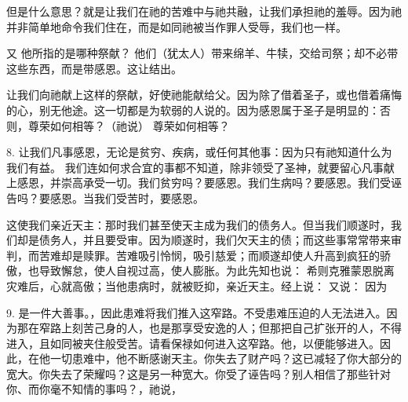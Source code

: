 但是什么意思？就是让我们在祂的苦难中与祂共融，让我们承担祂的羞辱。因为祂并非简单地命令我们住在，而是如同祂被当作罪人受辱，我们也一样。\par

又 他所指的是哪种祭献？ 他们（犹太人）带来绵羊、牛犊，交给司祭；却不必带这些东西，而是带感恩。这让结出。\par

 让我们向祂献上这样的祭献，好使祂能献给父。因为除了借着圣子，或也借着痛悔的心，别无他途。这一切都是为软弱的人说的。因为感恩属于圣子是明显的：否则，尊荣如何相等？（祂说）  尊荣如何相等？\par

8. 让我们凡事感恩，无论是贫穷、疾病，或任何其他事：因为只有祂知道什么为我们有益。  我们连如何求合宜的事都不知道，除非领受了圣神，就要留心凡事献上感恩，并崇高承受一切。我们贫穷吗？要感恩。我们生病吗？要感恩。我们受诬告吗？要感恩。当我们受苦时，要感恩。\par

这使我们亲近天主：那时我们甚至使天主成为我们的债务人。但当我们顺遂时，我们却是债务人，并且要受审。因为顺遂时，我们欠天主的债；而这些事常常带来审判，而苦难却是赎罪。苦难吸引怜悯，吸引慈爱；而顺遂却使人升高到疯狂的骄傲，也导致懈怠，使人自视过高，使人膨胀。为此先知也说：  希则克雅蒙恩脱离灾难后，心就高傲；当他患病时，就被贬抑，亲近天主。经上说：  又说：  因为 \par

9.  是一件大善事。，因此患难将我们推入这窄路。不受患难压迫的人无法进入。因为那在窄路上刻苦己身的人，也是那享受安逸的人；但那把自己扩张开的人，不得进入，且如同被夹住般受苦。请看保禄如何进入这窄路。他，以便能够进入。因此，在他一切患难中，他不断感谢天主。你失去了财产吗？这已减轻了你大部分的宽大。你失去了荣耀吗？这是另一种宽大。你受了诬告吗？别人相信了那些针对你、而你毫不知情的事吗？，祂说，\par

